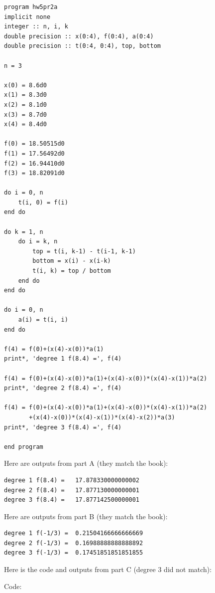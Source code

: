 \documentclass[12pt]{article}
\begin{document}
\begin{verbatim}
program hw5pr2a
implicit none
integer :: n, i, k
double precision :: x(0:4), f(0:4), a(0:4)
double precision :: t(0:4, 0:4), top, bottom

n = 3 

x(0) = 8.6d0
x(1) = 8.3d0
x(2) = 8.1d0
x(3) = 8.7d0
x(4) = 8.4d0

f(0) = 18.50515d0
f(1) = 17.56492d0
f(2) = 16.94410d0
f(3) = 18.82091d0

do i = 0, n
	t(i, 0) = f(i)
end do

do k = 1, n
	do i = k, n 
		top = t(i, k-1) - t(i-1, k-1)
		bottom = x(i) - x(i-k)
		t(i, k) = top / bottom
	end do
end do

do i = 0, n
	a(i) = t(i, i)
end do

f(4) = f(0)+(x(4)-x(0))*a(1)
print*, 'degree 1 f(8.4) =', f(4)

f(4) = f(0)+(x(4)-x(0))*a(1)+(x(4)-x(0))*(x(4)-x(1))*a(2)
print*, 'degree 2 f(8.4) =', f(4)

f(4) = f(0)+(x(4)-x(0))*a(1)+(x(4)-x(0))*(x(4)-x(1))*a(2)
       +(x(4)-x(0))*(x(4)-x(1))*(x(4)-x(2))*a(3)
print*, 'degree 3 f(8.4) =', f(4)

end program
\end{verbatim}

Here are outputs from part A (they match the book):

\begin{verbatim}
degree 1 f(8.4) =   17.878330000000002
degree 2 f(8.4) =   17.877130000000001
degree 3 f(8.4) =   17.877142500000001
\end{verbatim}
 
Here are outputs from part B (they match the book):

\begin{verbatim}
degree 1 f(-1/3) =  0.21504166666666669
degree 2 f(-1/3) =  0.16988888888888892
degree 3 f(-1/3) =  0.17451851851851855
\end{verbatim}

Here is the code and outputs from part C (degree 3 did not match):

Code:
\end{document}
